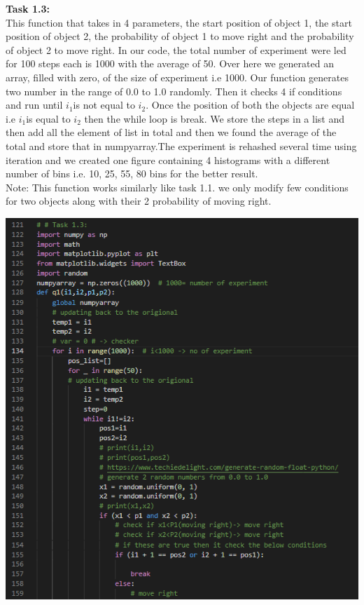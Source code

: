 \documentclass[answers]{exam}
\begin{document}
\begin{framed}
\textbf{Task 1.3:\\}
This function that takes in 4 parameters, the start position of object 1,  the start position of object 2,  the probability of object 1 to move right and the probability of object 2 to move right. In our code, the total number of experiment were led for 100 steps each is 1000 with the average of 50. Over here we generated an array, filled with zero, of the size of experiment i.e 1000. Our function generates two number in the range of 0.0 to 1.0 randomly. Then it checks 4 if conditions and run until $i_{1}$is not equal to $i_{2}$. Once the position of both the objects are equal i.e $i_{1}$is equal to $i_{2}$ then the while loop is break. We store the steps in a list and then add all the element of list in total and then we found the average of the total and store that in numpyarray.The experiment is rehashed several time using iteration and we created one figure containing 4 histograms with a different number of bins i.e. 10, 25, 55, 80 bins for the better result. \\
Note: This function works similarly like task 1.1. we only modify few conditions for two objects along with their 2 probability of moving right.
\begin{center}
\includegraphics[scale=1]{task1.3_a.PNG}\\

\end{center}
\end{framed}
\end{document}
